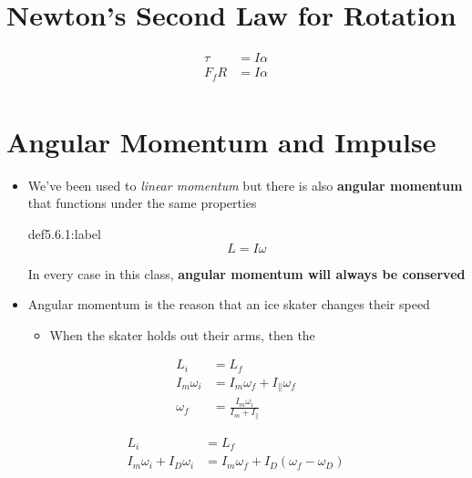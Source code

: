 \section{Newton's Second Law for Rotation}

\[
\begin{aligned}
    \tau &= I\alpha\\
    F_fR &= I\alpha\\
\end{aligned}    
\]


\section{Angular Momentum and Impulse}

\begin{itemize}
    \item We've been used to \textit{linear momentum} but there is also \textbf{angular momentum} that functions under the same properties
    
    \begin{definition}{def5.6.1:label}
        \[
        L = I\omega     
        \]

        In every case in this class, \textbf{angular momentum will always be conserved}
    \end{definition}

    \item Angular momentum is the reason that an ice skater changes their speed
    \begin{itemize}
        \item When the skater holds out their arms, then the 
    \end{itemize}
\end{itemize}

\begin{problem}
    \[
    \begin{aligned}
        L_i &= L_f\\
        I_m\omega_i &= I_m\omega_f + I_\parallel\omega_f\\
        \omega_f &= \frac{I_m\omega_i}{I_m + I_\parallel}
    \end{aligned}    
    \]
\end{problem}


\begin{problem}
    \[
    \begin{aligned}
        L_i &= L_f\\
        I_m\omega_i + I_D\omega_i &= I_m\omega_f + I_D(\omega_f - \omega_D)
    \end{aligned}    
    \]
\end{problem}

